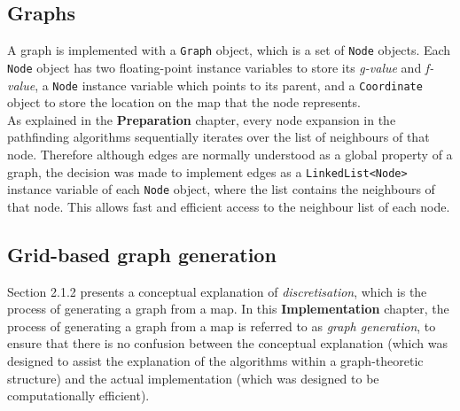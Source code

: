 \documentclass[12pt,notitlepage]{report}
\begin{document}
\subsection{Graphs}
A graph is implemented with a {\tt Graph} object, which is a set of {\tt Node} objects. Each {\tt Node} object has two floating-point instance variables to store its {\em g-value} and {\em f-value}, a {\tt Node} instance variable which points to its parent, and a {\tt Coordinate} object to store the location on the map that the node represents.\\

\noindent
As explained in the {\bfseries Preparation} chapter, every node expansion in the pathfinding algorithms sequentially iterates over the list of neighbours of that node. Therefore although edges are normally understood as a global property of a graph, the decision was made to implement edges as a {\tt LinkedList<Node>} instance variable of each {\tt Node} object, where the list contains the neighbours of that node. This allows fast and efficient access to the neighbour list of each node.\\

\subsection{Grid-based graph generation}
Section 2.1.2 presents a conceptual explanation of {\em discretisation}, which is the process of generating a graph from a map. In this {\bfseries Implementation} chapter, the process of generating a graph from a map is referred to as {\em graph generation}, to ensure that there is no confusion between the conceptual explanation (which was designed to assist the explanation of the algorithms within a graph-theoretic structure) and the actual implementation (which was designed to be computationally efficient). \\
\end{document}
